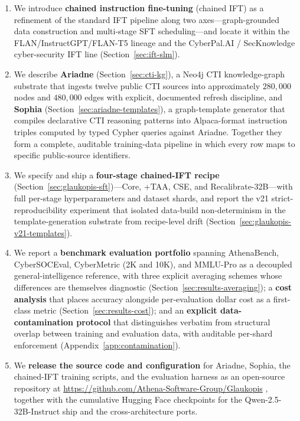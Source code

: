 \documentclass[webpdf,contemporary,large]{oup-authoring-template}
\theoremstyle{thmstyleone}
\theoremstyle{thmstyletwo}
\theoremstyle{thmstylethree}
\begin{document}
\begin{enumerate}
  \item We introduce \textbf{chained instruction fine-tuning} (chained IFT) as a refinement of the standard IFT pipeline along two axes---graph-grounded data construction and multi-stage SFT scheduling---and locate it within the FLAN/InstructGPT/FLAN-T5 lineage and the CyberPal.AI / SecKnowledge cyber-security IFT line (Section~\ref{sec:ift-slm}).

  \item We describe \textbf{Ariadne} (Section~\ref{sec:cti-kg}), a Neo4j CTI knowledge-graph substrate that ingests twelve public CTI sources into approximately $280{,}000$ nodes and $480{,}000$ edges with explicit, documented refresh discipline, and \textbf{Sophia} (Section~\ref{sec:ariadne-templates}), a graph-template generator that compiles declarative CTI reasoning patterns into Alpaca-format instruction triples computed by typed Cypher queries against Ariadne. Together they form a complete, auditable training-data pipeline in which every row maps to specific public-source identifiers.

  \item We specify and ship a \textbf{four-stage chained-IFT recipe} (Section~\ref{sec:glaukopis-sft})---Core, +TAA, CSE, and Recalibrate-32B---with full per-stage hyperparameters and dataset shards, and report the v21 strict-reproducibility experiment that isolated data-build non-determinism in the template-generation substrate from recipe-level drift (Section~\ref{sec:glaukopis-v21-templates}).

  \item We report a \textbf{benchmark evaluation portfolio} spanning AthenaBench, CyberSOCEval, CyberMetric (2K and 10K), and MMLU-Pro as a decoupled general-intelligence reference, with three explicit averaging schemes whose differences are themselves diagnostic (Section~\ref{sec:results-averaging}); a \textbf{cost analysis} that places accuracy alongside per-evaluation dollar cost as a first-class metric (Section~\ref{sec:results-cost}); and an \textbf{explicit data-contamination protocol} that distinguishes verbatim from structural overlap between training and evaluation data, with auditable per-shard enforcement (Appendix~\ref{app:contamination}).

  \item We \textbf{release the source code and configuration} for Ariadne, Sophia, the chained-IFT training scripts, and the evaluation harness as an open-source repository at \url{https://github.com/Athena-Software-Group/Glaukopis} \cite{glaukopis2026repo}, together with the cumulative Hugging Face checkpoints for the Qwen-2.5-32B-Instruct ship and the cross-architecture ports.
\end{enumerate}
\end{document}
